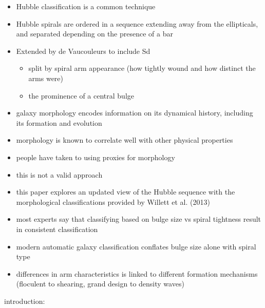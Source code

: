 \begin{itemize}
  \item Hubble classification is a common technique
  \item Hubble spirals are ordered in a sequence extending away from the ellipticals, and separated depending on the presence of a bar
  \item Extended by de Vaucouleurs to include Sd
  \begin{itemize}
    \item split by spiral arm appearance (how tightly wound and how distinct the arms were)
    \item the prominence of a central bulge
  \end{itemize}
  \item galaxy morphology encodes information on its dynamical history, including its formation and evolution
  \item morphology is known to correlate well with other physical properties
  \item people have taken to using proxies for morphology
  \item this is not a valid approach
  \item this paper explores an updated view of the Hubble sequence with the morphological classifications provided by Willett et al. (2013)
  \item most experts say that classifying based on bulge size vs spiral tightness result in consistent classification
  \item modern automatic galaxy classification conflates bulge size alone with spiral type
  \item differences in arm characteristics is linked to different formation mechanisms (floculent to shearing, grand design to density waves)
\end{itemize}

\citet{2019arXiv190804246D} introduction:

